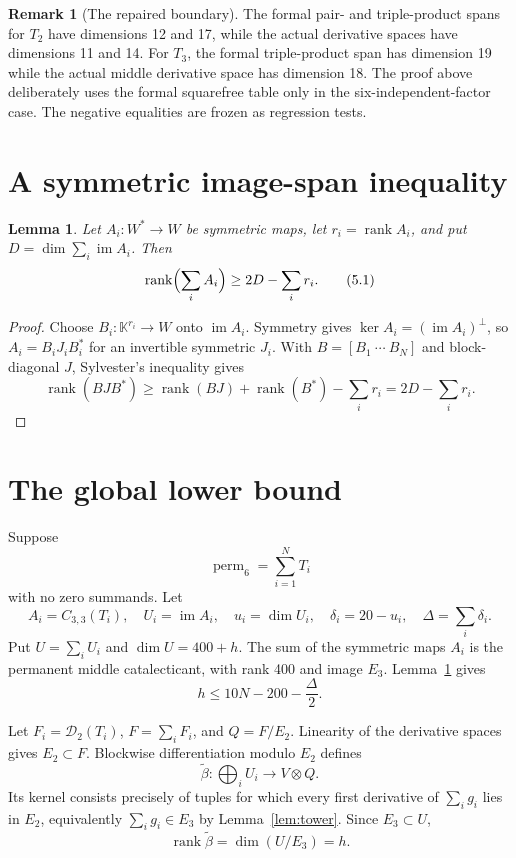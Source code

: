 \documentclass[11pt]{amsart}
\newcommand{\K}{\mathbb{K}}
\newcommand{\im}{\operatorname{im}}
\newcommand{\rank}{\operatorname{rank}}
\newcommand{\perm}{\operatorname{perm}}
\newcommand{\cD}{\mathcal{D}}
\newtheorem{lemma}[theorem]{Lemma}
\theoremstyle{definition}
\newtheorem{remark}[theorem]{Remark}
\begin{document}
\begin{remark}[The repaired boundary]\label{rem:repair}
The formal pair- and triple-product spans for \(T_2\) have dimensions 12
and 17, while the actual derivative spaces have dimensions 11 and 14. For
\(T_3\), the formal triple-product span has dimension 19 while the actual
middle derivative space has dimension 18. The proof above deliberately uses
the formal squarefree table only in the six-independent-factor case. The
negative equalities are frozen as regression tests.
\end{remark}

\section{A symmetric image-span inequality}

\begin{lemma}\label{lem:image-span}
Let \(A_i:W^*\to W\) be symmetric maps, let \(r_i=\rank A_i\), and put
\(D=\dim\sum_i\im A_i\). Then
\[
 \rank\Bigl(\sum_iA_i\Bigr)\ge2D-\sum_i r_i. \tag{5.1}
\]
\end{lemma}

\begin{proof}
Choose \(B_i:\K^{r_i}\to W\) onto \(\im A_i\). Symmetry gives
\(\ker A_i=(\im A_i)^\perp\), so
\(A_i=B_iJ_iB_i^*\) for an invertible symmetric \(J_i\). With
\(B=[B_1\ \cdots\ B_N]\) and block-diagonal \(J\), Sylvester's inequality
gives
\[
 \rank(BJB^*)\ge\rank(BJ)+\rank(B^*)-\sum_i r_i
 =2D-\sum_i r_i.
\]
\end{proof}

\section{The global lower bound}\label{sec:global}

Suppose
\[
 \perm_6=\sum_{i=1}^NT_i
\]
with no zero summands. Let
\[
 A_i=C_{3,3}(T_i),\quad U_i=\im A_i,\quad u_i=\dim U_i,
 \quad\delta_i=20-u_i,\quad\Delta=\sum_i\delta_i.
\]
Put \(U=\sum_iU_i\) and \(\dim U=400+h\). The sum of the symmetric maps
\(A_i\) is the permanent middle catalecticant, with rank 400 and image
\(E_3\). Lemma~\ref{lem:image-span} gives
\[
 \boxed{h\le10N-200-\frac\Delta2.} \tag{6.1}
\]

Let \(F_i=\cD_2(T_i)\), \(F=\sum_iF_i\), and \(Q=F/E_2\). Linearity of
the derivative spaces gives \(E_2\subset F\). Blockwise differentiation
modulo \(E_2\) defines
\[
 \widetilde\beta:\bigoplus_iU_i\longrightarrow V\otimes Q.
\]
Its kernel consists precisely of tuples for which every first derivative of
\(\sum_i g_i\) lies in \(E_2\), equivalently
\(\sum_i g_i\in E_3\) by Lemma~\ref{lem:tower}. Since \(E_3\subset U\),
\[
 \rank\widetilde\beta=\dim(U/E_3)=h. \tag{6.2}
\]
\end{document}
